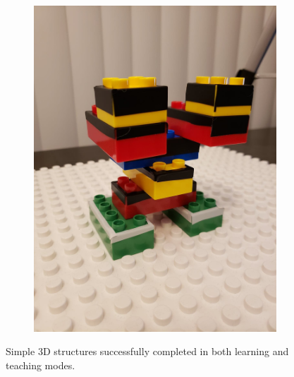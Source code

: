 \begin{figure}[H]
\begin{subfigure}{0.5\textwidth}
       \caption[{}]{\label{fig:fig_3-6f}}
    \end{subfigure}
    \begin{subfigure}{0.5\textwidth}
       \centering
       \includegraphics[width=0.8\linewidth,trim={0 15cm 0 15cm},clip]{figures/t5.jpg}
      
       \caption[{}]{ \label{fig:fig_3-6g}}
    \end{subfigure}
    \caption[{Simple 3D structures}]{Simple 3D structures successfully completed in both learning and teaching modes.}
   \label{fig:fig_3-6}
\end{figure}
